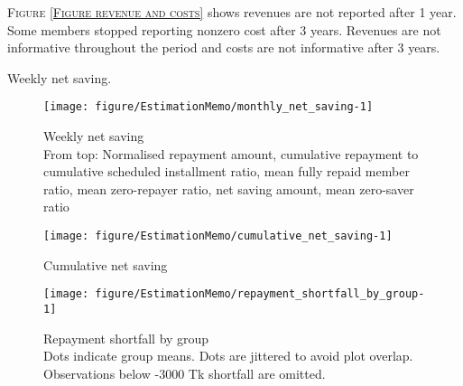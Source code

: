 \begin{palepinkleftbar}
\begin{finding}
\textsc{\small Figure \ref{Figure revenue and costs}} shows revenues are not reported after 1 year. Some members stopped reporting nonzero cost after 3 years. Revenues are not informative throughout the period and costs are not informative after 3 years.
\end{finding}
\end{palepinkleftbar}



Weekly net saving.

\begin{Schunk}
\begin{figure}

{\centering \texttt{[image: figure/EstimationMemo/monthly\_net\_saving-1]} 

}

\caption{Weekly net saving\\ {\footnotesize From top: Normalised repayment amount, cumulative repayment to cumulative scheduled installment ratio, mean fully repaid member ratio, mean zero-repayer ratio, net saving amount, mean zero-saver ratio\setlength{\baselineskip}{8pt}}}\label{Figure monthly net saving}
\end{figure}
\end{Schunk}
\begin{Schunk}
\begin{figure}

{\centering \texttt{[image: figure/EstimationMemo/cumulative\_net\_saving-1]} 

}

\caption[Cumulative net saving]{Cumulative net saving}\label{Figure cumulative net saving}
\end{figure}
\end{Schunk}
\begin{Schunk}
\begin{figure}

{\centering \texttt{[image: figure/EstimationMemo/repayment\_shortfall\_by\_group-1]} 

}

\caption{Repayment shortfall by group\\ {\footnotesize Dots indicate group means. Dots are jittered to avoid plot overlap. Observations below -3000 Tk shortfall are omitted.\setlength{\baselineskip}{8pt}}}\label{Figure repayment shortfall by group}
\end{figure}
\end{Schunk}

